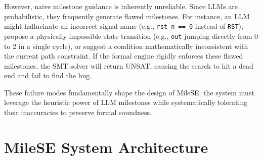 \documentclass[conference]{IEEEtran}
\begin{document}
However, naive milestone guidance is inherently unreliable. Since LLMs are probabilistic, they frequently generate flawed milestones. For instance, an LLM might hallucinate an incorrect signal name (e.g., \texttt{rst\_n == 0} instead of \texttt{RST}), propose a physically impossible state transition (e.g., \texttt{out} jumping directly from 0 to 2 in a single cycle), or suggest a condition mathematically inconsistent with the current path constraint. If the formal engine rigidly enforces these flawed milestones, the SMT solver will return UNSAT, causing the search to hit a dead end and fail to find the bug. 

These failure modes fundamentally shape the design of MileSE: the system must leverage the heuristic power of LLM milestones while systematically tolerating their inaccuracies to preserve formal soundness.

\section{MileSE System Architecture}
\label{sec:architecture}

\end{document}
